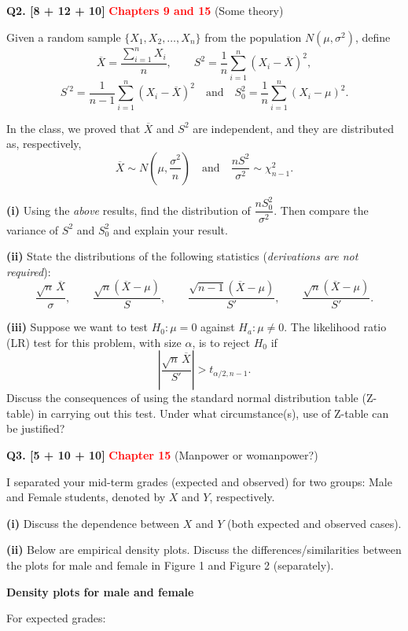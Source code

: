\documentclass[11pt]{article}
\begin{document}
\bigskip

\textbf{Q2. [8 + 12 + 10]} \textbf{\textcolor{red}{Chapters 9 and 15}} (Some theory)

Given a random sample $\{X_1,X_2,\ldots,X_n\}$ from the population $N(\mu,\sigma^2)$, define
\[
\overline X=\frac{\sum_{i=1}^{n}X_i}{n},\qquad
S^2=\frac{1}{n}\sum_{i=1}^{n}(X_i-\overline X)^2,
\]
\[
S^{\prime 2}=\frac{1}{n-1}\sum_{i=1}^{n}(X_i-\overline X)^2
\quad\text{and}\quad
S_0^2=\frac{1}{n}\sum_{i=1}^{n}(X_i-\mu)^2.
\]

In the class, we proved that $\overline X$ and $S^2$ are independent, and they are distributed as, respectively,
\[
\overline X\sim N\!\left(\mu,\frac{\sigma^2}{n}\right)
\quad\text{and}\quad
\frac{nS^2}{\sigma^2}\sim\chi^2_{n-1}.
\]

\textbf{(i)} Using the \emph{above} results, find the distribution of $\dfrac{nS_0^2}{\sigma^2}$. Then compare the variance of $S^2$ and $S_0^2$ and explain your result.

\textbf{(ii)} State the distributions of the following statistics (\emph{derivations are not required}):
\[
\frac{\sqrt n\,\overline X}{\sigma},\qquad
\frac{\sqrt n(\overline X-\mu)}{S},\qquad
\frac{\sqrt{n-1}(\overline X-\mu)}{S'},\qquad
\frac{\sqrt n(\overline X-\mu)}{S'}.
\]

\textbf{(iii)} Suppose we want to test $H_0:\mu=0$ against $H_a:\mu\neq 0$. The likelihood ratio (LR) test for this problem, with size $\alpha$, is to reject $H_0$ if
\[
\left|\frac{\sqrt n\,\overline X}{S'}\right|>t_{\alpha/2,n-1}.
\]
Discuss the consequences of using the standard normal distribution table (Z-table) in carrying out this test. Under what circumstance(s), use of Z-table can be justified?

\bigskip

\textbf{Q3. [5 + 10 + 10]} \textbf{\textcolor{red}{Chapter 15}} (Manpower or womanpower?)

I separated your mid-term grades (expected and observed) for two groups: Male and Female students, denoted by $X$ and $Y$, respectively.

\textbf{(i)} Discuss the dependence between $X$ and $Y$ (both expected and observed cases).

\textbf{(ii)} Below are empirical density plots. Discuss the differences/similarities between the plots for male and female in Figure 1 and Figure 2 (separately).

\textbf{Density plots for male and female}

For expected grades:
\end{document}
